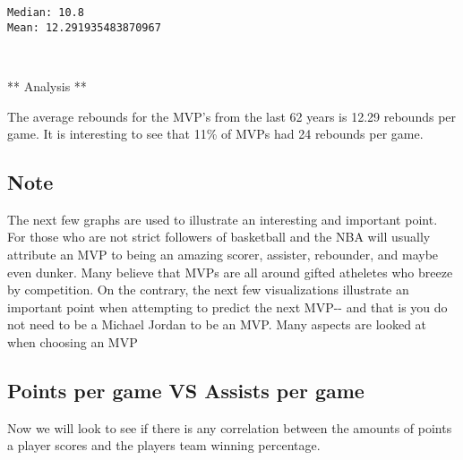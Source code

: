 \documentclass[11pt]{article}
\begin{document}
    \begin{Verbatim}[commandchars=\\\{\}]
Median: 10.8
Mean: 12.291935483870967

    \end{Verbatim}

    \begin{center}
    \end{center}
    { \hspace*{\fill} \\}
    
    ** Analysis **

The average rebounds for the MVP's from the last 62 years is 12.29
rebounds per game. It is interesting to see that 11\% of MVPs had 24
rebounds per game.

\subsection{Note}\label{note}

The next few graphs are used to illustrate an interesting and important
point. For those who are not strict followers of basketball and the NBA
will usually attribute an MVP to being an amazing scorer, assister,
rebounder, and maybe even dunker. Many believe that MVPs are all around
gifted atheletes who breeze by competition. On the contrary, the next
few visualizations illustrate an important point when attempting to
predict the next MVP-\/- and that is you do not need to be a Michael
Jordan to be an MVP. Many aspects are looked at when choosing an MVP

\subsection{Points per game VS Assists per
game}\label{points-per-game-vs-assists-per-game}

Now we will look to see if there is any correlation between the amounts
of points a player scores and the players team winning percentage.
\end{document}
